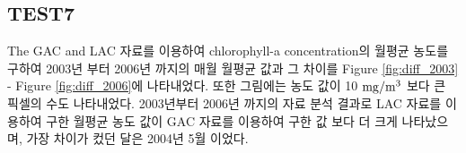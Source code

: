 \subsection{TEST7}
 
The GAC and LAC 자료를 이용하여 chlorophyll-a concentration의 월평균 농도를 구하여 2003년 부터 2006년 까지의 매월 월평균 값과 그 차이를 Figure \ref{fig:diff_2003} - Figure \ref{fig:diff_2006}에 나타내었다. 또한 그림에는 농도 값이 10  ${\rm mg/m^3}$ 보다 큰 픽셀의 수도 나타내었다. 2003년부터 2006년 까지의 자료 분석 결과로 LAC 자료를 이용하여 구한 월평균 농도 값이 GAC 자료를 이용하여 구한 값 보다 더 크게 나타났으며, 가장 차이가 컸던 달은 2004년 5월 이었다.
 


